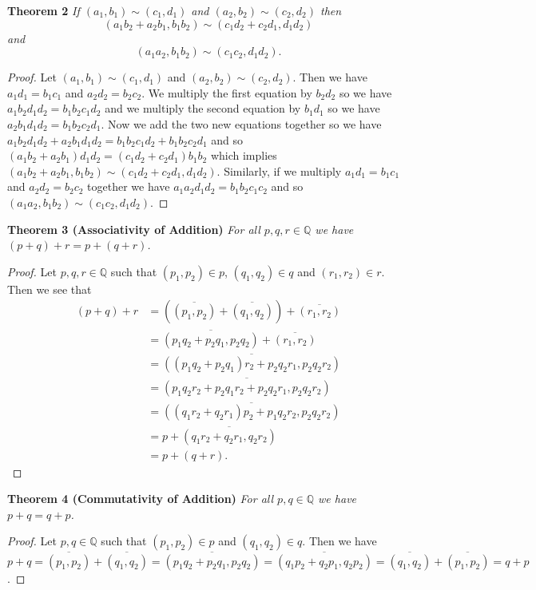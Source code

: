 \documentclass{article}
\begin{document}
\begin{flushleft}
\textbf{Theorem 2}
\textsl{If $(a_1,b_1) \sim (c_1,d_1)$ and $(a_2,b_2) \sim (c_2,d_2)$ then
\[
(a_1b_2+a_2b_1,b_1b_2) \sim (c_1d_2+c_2d_1,d_1d_2)
\]
and
\[
(a_1a_2,b_1b_2) \sim (c_1c_2,d_1d_2).
\]}
\begin{proof}
Let $(a_1,b_1) \sim (c_1,d_1)$ and $(a_2,b_2) \sim (c_2,d_2)$. Then we have $a_1d_1=b_1c_1$ and $a_2d_2=b_2c_2$. We multiply the first equation by $b_2d_2$ so we have $a_1b_2d_1d_2 = b_1b_2c_1d_2$ and we multiply the second equation by $b_1d_1$ so we have $a_2b_1d_1d_2 = b_1b_2c_2d_1$. Now we add the two new equations together so we have $a_1b_2d_1d_2 + a_2b_1d_1d_2 = b_1b_2c_1d_2 + b_1b_2c_2d_1$ and so $(a_1b_2+a_2b_1)d_1d_2 = (c_1d_2 + c_2d_1)b_1b_2$ which implies $(a_1b_2+a_2b_1,b_1b_2) \sim (c_1d_2+c_2d_1,d_1d_2)$. Similarly, if we multiply $a_1d_1=b_1c_1$ and $a_2d_2=b_2c_2$ together we have $a_1a_2d_1d_2=b_1b_2c_1c_2$ and so $(a_1a_2,b_1b_2) \sim (c_1c_2,d_1d_2)$.
\end{proof}

\textbf{Theorem 3 (Associativity of Addition)}
\textsl{For all $p,q,r \in \mathbb{Q}$ we have $(p+q)+r = p+(q+r)$.}
\begin{proof}
Let $p,q,r \in \mathbb{Q}$ such that $(p_1,p_2) \in p$, $(q_1,q_2) \in q$ and $(r_1,r_2) \in r$. Then we see that
\begin{align*}
(p+q)+r&=\left(\overline{(p_1,p_2)}+\overline{(q_1,q_2)}\right)+\overline{(r_1,r_2)} \\
		&=\overline{(p_1q_2+p_2q_1,p_2q_2)}+\overline{(r_1,r_2)} \\
		&=\overline{((p_1q_2+p_2q_1)r_2+p_2q_2r_1,p_2q_2r_2)} \\
		&=\overline{(p_1q_2r_2+p_2q_1r_2+p_2q_2r_1,p_2q_2r_2)} \\
		&=\overline{((q_1r_2+q_2r_1)p_2+p_1q_2r_2,p_2q_2r_2)} \\
		&=p+\overline{(q_1r_2+q_2r_1,q_2r_2)} \\
		&=p+(q+r).
\end{align*}
\end{proof}

\textbf{Theorem 4 (Commutativity of Addition)}
\textsl{For all $p,q \in \mathbb{Q}$ we have $p+q=q+p$.}
\begin{proof}
Let $p,q \in \mathbb{Q}$ such that $(p_1,p_2) \in p$ and $(q_1,q_2) \in q$. Then we have $p+q=\overline{(p_1,p_2)}+\overline{(q_1,q_2)}=\overline{(p_1q_2+p_2q_1,p_2q_2)}=\overline{(q_1p_2+q_2p_1,q_2p_2)}=\overline{(q_1,q_2)}+\overline{(p_1,p_2)}=q+p$.
\end{proof}


\end{flushleft}
\end{document}
